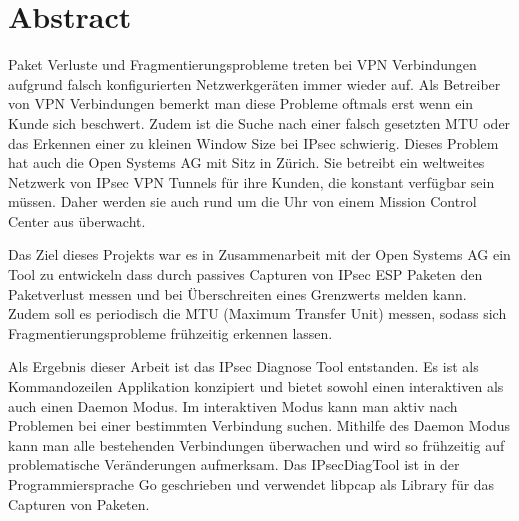 
\chapter*{Abstract}

Paket Verluste und Fragmentierungsprobleme treten bei VPN Verbindungen aufgrund falsch konfigurierten Netzwerkgeräten immer wieder auf. Als Betreiber von VPN Verbindungen bemerkt man diese Probleme oftmals erst wenn ein Kunde sich beschwert. Zudem ist die Suche nach einer falsch gesetzten MTU oder das Erkennen einer zu kleinen Window Size bei IPsec schwierig.
Dieses Problem hat auch die Open Systems AG mit Sitz in Zürich. Sie betreibt ein weltweites Netzwerk von IPsec VPN Tunnels für ihre Kunden, die konstant verfügbar sein müssen. Daher werden sie auch rund um die Uhr von einem Mission Control Center aus überwacht.

Das Ziel dieses Projekts war es in Zusammenarbeit mit der Open Systems AG ein Tool zu entwickeln dass durch passives Capturen von IPsec ESP Paketen den Paketverlust messen und bei Überschreiten eines Grenzwerts melden kann. Zudem soll es periodisch die MTU (Maximum Transfer Unit) messen, sodass sich Fragmentierungsprobleme frühzeitig erkennen lassen.

Als Ergebnis dieser Arbeit ist das IPsec Diagnose Tool entstanden. Es ist als Kommandozeilen Applikation konzipiert und bietet sowohl einen interaktiven als auch einen Daemon Modus. Im interaktiven Modus kann man aktiv nach Problemen bei einer bestimmten Verbindung suchen. Mithilfe des Daemon Modus kann man alle bestehenden Verbindungen überwachen und wird so frühzeitig auf problematische Veränderungen aufmerksam.
Das IPsecDiagTool ist in der Programmiersprache Go geschrieben und verwendet libpcap als Library für das Capturen von Paketen. 